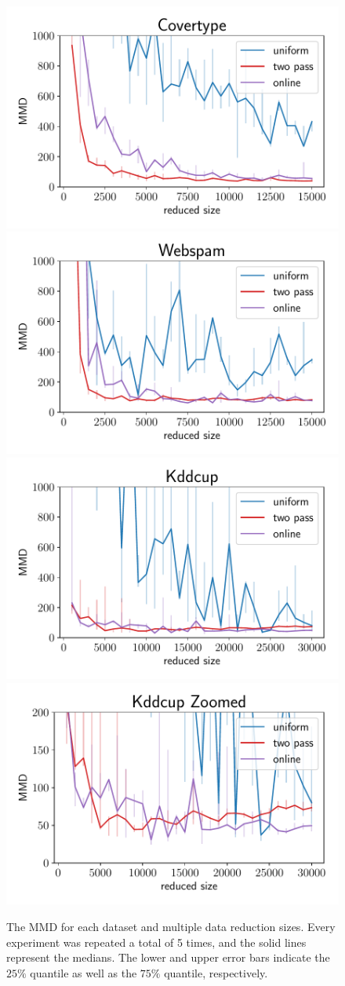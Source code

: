 \begin{figure}[ht!]
    \centering
    \includegraphics[width=.49\linewidth]{figures/covertype_bayes_plot_mmd.pdf}
    \includegraphics[width=.49\linewidth]{figures/webspam_bayes_plot_mmd.pdf}
    \includegraphics[width=.49\linewidth]{figures/kddcup_bayes_plot_mmd.pdf}
    \includegraphics[width=.49\linewidth]{figures/kddcup_bayes_plot_mmd_zoomed.pdf}
    \caption{The MMD for each dataset and multiple data reduction
        sizes. Every experiment was repeated a total
        of 5 times, and the solid lines represent the
        medians. The lower and upper error bars indicate the
        $25\%$ quantile as well as the $75\%$ quantile, respectively.}
    \label{fig:bayes-plots-mmd}
\end{figure}


